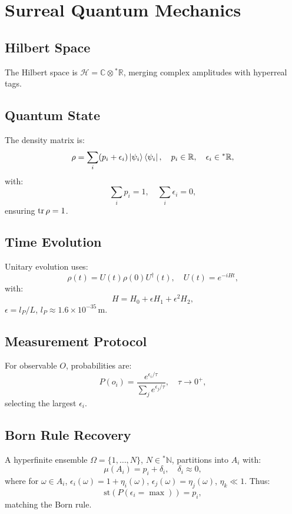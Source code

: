 \documentclass{article}
\begin{document}
\section{Surreal Quantum Mechanics}
\subsection{Hilbert Space}
The Hilbert space is \(\mathcal{H} = \mathbb{C} \otimes {}^*\mathbb{R}\), merging complex amplitudes with hyperreal tags.

\subsection{Quantum State}
The density matrix is:
\begin{equation}
\rho = \sum_i (p_i + \epsilon_i) \ket{\psi_i}\bra{\psi_i}, \quad p_i \in \mathbb{R}, \quad \epsilon_i \in {}^*\mathbb{R},
\end{equation}
with:
\begin{equation}
\sum_i p_i = 1, \quad \sum_i \epsilon_i = 0,
\end{equation}
ensuring \(\tr \rho = 1\).

\subsection{Time Evolution}
Unitary evolution uses:
\begin{equation}
\rho(t) = U(t) \rho(0) U^\dagger(t), \quad U(t) = e^{-i H t},
\end{equation}
with:
\begin{equation}
H = H_0 + \epsilon H_1 + \epsilon^2 H_2,
\end{equation}
\(\epsilon = l_P / L\), \(l_P \approx 1.6 \times 10^{-35} \, \text{m}\).

\subsection{Measurement Protocol}
For observable \(O\), probabilities are:
\begin{equation}
P(o_i) = \frac{e^{\epsilon_i / \tau}}{\sum_j e^{\epsilon_j / \tau}}, \quad \tau \to 0^+,
\end{equation}
selecting the largest \(\epsilon_i\).

\subsection{Born Rule Recovery}
A hyperfinite ensemble \(\Omega = \{1, \dots, N\}\), \(N \in {}^*\mathbb{N}\), partitions into \(A_i\) with:
\begin{equation}
\mu(A_i) = p_i + \delta_i, \quad \delta_i \approx 0,
\end{equation}
where for \(\omega \in A_i\), \(\epsilon_i(\omega) = 1 + \eta_i(\omega)\), \(\epsilon_j(\omega) = \eta_j(\omega)\), \(\eta_k \ll 1\). Thus:
\begin{equation}
\text{st}(P(\epsilon_i = \max)) = p_i,
\end{equation}
matching the Born rule.
\end{document}
